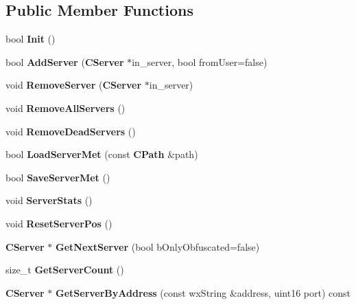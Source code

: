 \subsection*{Public Member Functions}
\begin{DoxyCompactItemize}
\item 
bool {\bfseries Init} ()\label{classCServerList_a7bf635abecbb793b48939b5c1978205b}

\item 
bool {\bfseries AddServer} ({\bf CServer} $\ast$in\_\-server, bool fromUser=false)\label{classCServerList_a706430efa1c9ba6892cade533793be24}

\item 
void {\bfseries RemoveServer} ({\bf CServer} $\ast$in\_\-server)\label{classCServerList_aa76a76f65181b1ca7d41b691abf64e8b}

\item 
void {\bfseries RemoveAllServers} ()\label{classCServerList_aa7a705a157aa5bb02fcb5a3ace227131}

\item 
void {\bfseries RemoveDeadServers} ()\label{classCServerList_adb7cd56a0d08d98c904fa43729bd898c}

\item 
bool {\bfseries LoadServerMet} (const {\bf CPath} \&path)\label{classCServerList_abb770a11747338a146b52d1c07263e04}

\item 
bool {\bfseries SaveServerMet} ()\label{classCServerList_af874a3fe0ed819ed63271fb0360dfa8a}

\item 
void {\bfseries ServerStats} ()\label{classCServerList_a2e6d9fa9ba3c23d123e9b826195beb1f}

\item 
void {\bfseries ResetServerPos} ()\label{classCServerList_aa48250963383d95d3e255e1403336d31}

\item 
{\bf CServer} $\ast$ {\bfseries GetNextServer} (bool bOnlyObfuscated=false)\label{classCServerList_a766d70911cb5063a21672c595fec7724}

\item 
size\_\-t {\bfseries GetServerCount} ()\label{classCServerList_a63a5758f03dfba4de674e33ba3e36ce3}

\item 
{\bf CServer} $\ast$ {\bfseries GetServerByAddress} (const wxString \&address, uint16 port) const \label{classCServerList_acb1888734e94581722cd34e2fdb99298}


\end{DoxyCompactItemize}

